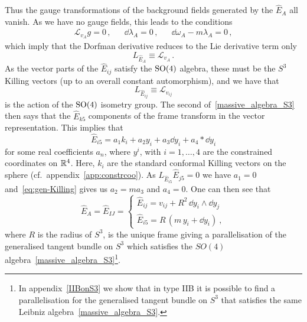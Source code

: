 \documentclass[debug]{phd}
\begin{document}
				Thus the gauge transformations of the background fields generated by the $\hat{E}_A$ all vanish. 
				As we have no gauge fields, this leads to the conditions
							\begin{align}\label{eq:gen-Killing}
								& & \mathcal{L}_{v_A} g = 0 \, , & &  \dd \lambda_A = 0 \, ,& & \dd \omega_A - m \lambda_A = 0 \, ,& & 
							\end{align}
				which imply that the Dorfman derivative reduces to the Lie derivative term only
							\begin{equation}
								L_{\hat{E}_A} \equiv \mathcal{L}_{v_A} \, . 
							\end{equation}
				As the vector parts of the $\hat{E}_{ij}$ satisfy the $\mathrm{SO}(4)$ algebra, these must be the $S^3$ Killing vectors (up to an overall constant automorphism), and we have that
							\begin{equation}
								L_{\hat{E}_{ij}} \equiv \mathcal{L}_{v_{ij}} 
							\end{equation}
				is the action of the $\mathrm{SO}(4)$ isometry group. 
				The second of~\eqref{massive_algebra_S3} then says that the $\hat{E}_{k 5}$ components of the frame transform in the vector representation. 
				This implies that
							\begin{equation}
								\hat{E}_{i5} = a_1 k_i + a_2 y_i + a_3 \dd y_i + a_4 * \dd y_i
							\end{equation}
				for some real coefficients $a_n$, where $y^i$, with $i=1, \ldots, 4$ are the constrained coordinates on $\mathbb{R}^4$. 
				Here, $k_i$ are the standard conformal Killing vectors on the sphere (cf.~appendix~\ref{app:constrcoo}). 
				As $L_{\hat{E}_{i5}} \hat{E}_{j5} = 0$ we have $a_1=0$ and~\eqref{eq:gen-Killing} gives us $a_2 = ma_3$ and $a_4=0$. 
 				One can then see that
						\begin{equation}\label{parall_S3_m}
							\hat{E}_A = \hat{E}_{IJ} = \begin{cases} \hat{E}_{ij} = v_{ij} + R^2 \,\dd y_i \wedge \dd y_j \\[1mm]
														\hat{E}_{i5} = R\,(m\,y_i + \dd y_i)\ , \end{cases} 
							\end{equation}
%
				where $R$ is the radius of $S^3$, is the unique frame giving a parallelisation of the generalised tangent bundle on $S^3$ which satisfies the $SO(4)$ algebra~\eqref{massive_algebra_S3}\footnote{%
					In appendix~\ref{IIBonS3} we show that in type IIB it is possible to find a parallelisation for the generalised tangent bundle on $S^3$ that satisfies the same Leibniz algebra~\eqref{massive_algebra_S3}.}.
\end{document}
